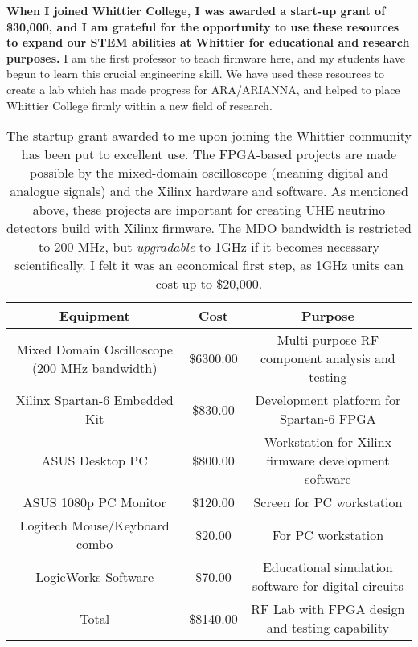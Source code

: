 \documentclass[../../main.tex]{subfiles}
\begin{document}
\textbf{When I joined Whittier College, I was awarded a start-up grant of \$30,000, and I am grateful for the opportunity to use these resources to expand our STEM abilities at Whittier for educational and research purposes.}  I am the first professor to teach firmware here, and my students have begun to learn this crucial engineering skill.  We have used these resources to create a lab which has made progress for ARA/ARIANNA, and helped to place Whittier College firmly within a new field of research.

\begin{table}
\small
\centering
\begin{tabular}{|c|c|c|}
\hline \hline
Equipment & Cost & Purpose \\ \hline
Mixed Domain Oscilloscope (200 MHz bandwidth) & \$6300.00 & Multi-purpose RF component analysis and testing \\ \hline
Xilinx Spartan-6 Embedded Kit & \$830.00 & Development platform for Spartan-6 FPGA \\ \hline
ASUS Desktop PC & \$800.00 & Workstation for Xilinx firmware development software \\ \hline
ASUS 1080p PC Monitor & \$120.00 & Screen for PC workstation \\ \hline
Logitech Mouse/Keyboard combo & \$20.00 & For PC workstation \\ \hline
LogicWorks Software & \$70.00 & Educational simulation software for digital circuits \\ \hline
Total & \$8140.00 & RF Lab with FPGA design and testing capability \\ \hline
\hline
\end{tabular}
\caption{\label{tab:fund2} The startup grant awarded to me upon joining the Whittier community has been put to excellent use.  The FPGA-based projects are made possible by the mixed-domain oscilloscope (meaning digital and analogue signals) and the Xilinx hardware and software.  As mentioned above, these projects are important for creating UHE neutrino detectors build with Xilinx firmware.  The MDO bandwidth is restricted to 200 MHz, but \textit{upgradable} to 1GHz if it becomes necessary scientifically.  I felt it was an economical first step, as 1GHz units can cost up to \$20,000.}
\end{table}
\end{document}
